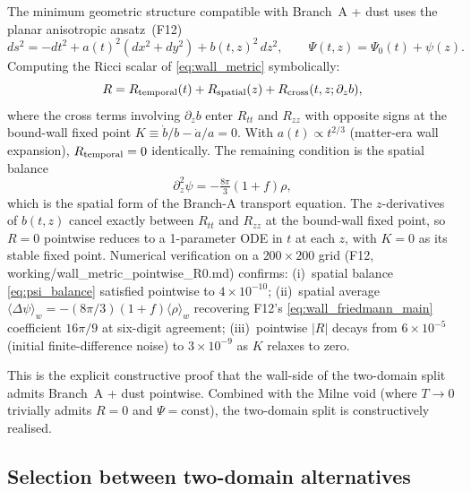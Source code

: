 \documentclass[aps,prd,twocolumn,nofootinbib,floatfix,superscriptaddress]{revtex4-2}
\begin{document}
The minimum geometric structure compatible with Branch~A + dust uses
the planar anisotropic ansatz~(F12)
\begin{equation}
\label{eq:wall_metric}
ds^2 = -dt^2 + a(t)^2(dx^2+dy^2) + b(t,z)^2\,dz^2,
\qquad
\Psi(t,z) = \Psi_0(t) + \psi(z).
\end{equation}
Computing the Ricci scalar of \eqref{eq:wall_metric} symbolically:
\begin{equation}
R = R_{\rm temporal}(t) + R_{\rm spatial}(z) +
   R_{\rm cross}(t,z;\partial_z b),
\end{equation}
where the cross terms involving $\partial_z b$ enter
$R_{tt}$ and $R_{zz}$ with opposite signs at the bound-wall fixed
point $K \equiv \dot b/b - \dot a/a = 0$. With $a(t)\propto t^{2/3}$
(matter-era wall expansion), $R_{\rm temporal} = 0$ identically. The
remaining condition is the spatial balance
\begin{equation}
\label{eq:psi_balance}
\partial_z^2\psi = -\tfrac{8\pi}{3}(1+f)\rho,
\end{equation}
which is the spatial form of the Branch-A transport equation. The
$z$-derivatives of $b(t,z)$ cancel exactly between $R_{tt}$ and
$R_{zz}$ at the bound-wall fixed point, so $R = 0$ pointwise reduces
to a 1-parameter ODE in $t$ at each $z$, with $K = 0$ as its stable
fixed point. Numerical verification on a $200\times 200$ grid
(F12, working/wall\_metric\_pointwise\_R0.md) confirms:
(i)~spatial balance \eqref{eq:psi_balance} satisfied pointwise to
$4\times 10^{-10}$;
(ii)~spatial average $\langle\Delta\psi\rangle_w =
-(8\pi/3)(1+f)\langle\rho\rangle_w$ recovering F12's
\eqref{eq:wall_friedmann_main} coefficient $16\pi/9$ at six-digit
agreement;
(iii)~pointwise $|R|$ decays from $6\times 10^{-5}$ (initial
finite-difference noise) to $3\times 10^{-9}$ as $K$ relaxes to zero.

This is the explicit constructive proof that the wall-side of the
two-domain split admits Branch~A + dust pointwise. Combined with
the Milne void (where $T \to 0$ trivially admits $R = 0$ and
$\Psi = \mathrm{const}$), the two-domain split is constructively
realised.

\subsection{Selection between two-domain alternatives}
\label{sec:wiltshire_selection}
\end{document}
